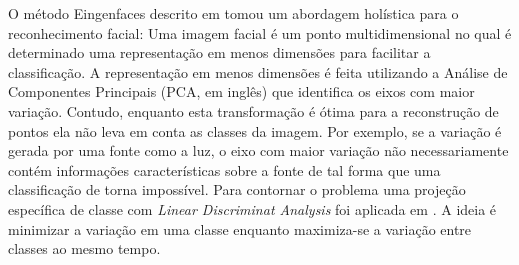 O método Eingenfaces descrito em \cite{eigenfaces} tomou um abordagem holística para o reconhecimento facial: Uma imagem facial é um ponto multidimensional no qual é determinado uma representação em menos dimensões para facilitar a classificação. A representação em menos dimensões é feita utilizando a Análise de Componentes Principais (PCA, em inglês) que identifica os eixos com maior variação. Contudo, enquanto esta transformação é ótima para a reconstrução de pontos ela não leva em conta as classes da imagem. Por exemplo, se a variação é gerada por uma fonte como a luz, o eixo com maior variação não necessariamente contém informações características sobre a fonte de tal forma que uma classificação de torna impossível. Para contornar o problema uma projeção específica de classe com \textit{Linear Discriminat Analysis} foi aplicada em \cite{fisherfaces}. A ideia é minimizar a variação em uma classe enquanto maximiza-se a variação entre classes ao mesmo tempo.

